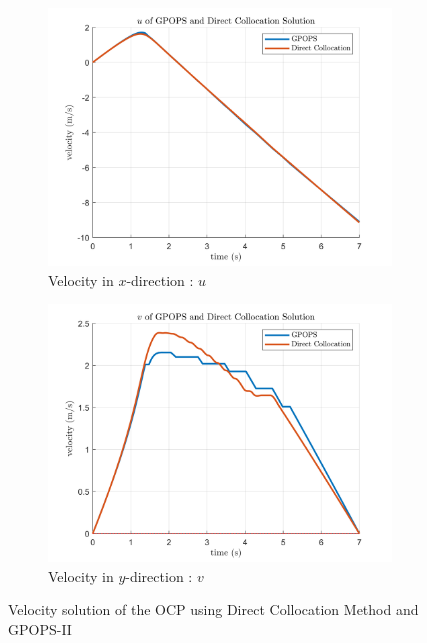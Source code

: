 \begin{figure}
	\begin{subfigure}[b]{0.49\linewidth}
		\includegraphics[width=\linewidth]{figures/GpopsDcolU.png}
		\caption{Velocity in $x$-direction : $u$}
		\label{fig:dircol_u}
	\end{subfigure}
	\hfill
	\begin{subfigure}[b]{0.49\linewidth}
		\includegraphics[width=\linewidth]{figures/GpopsDcolV.png}
		\caption{Velocity in $y$-direction : $v$}
		\label{fig:dircol_v}
	\end{subfigure}
	\centering
	\caption{Velocity solution of the OCP using Direct Collocation Method and GPOPS-II}
	\label{fig:dircol_gpops_vel}
\end{figure}

